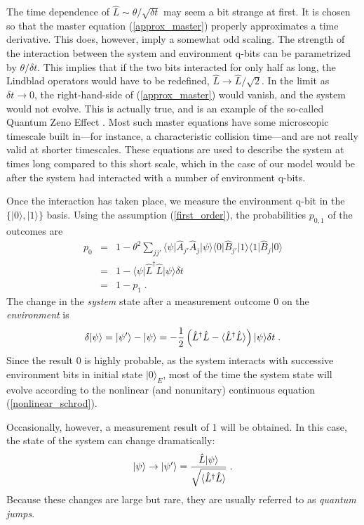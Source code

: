 \documentclass[12pt]{article}
\def\bra#1{{\langle #1 |}}
\def\ket#1{{| #1 \rangle}}
\def\expect#1{{\langle #1 \rangle}}
\def\A{{\hat A}}
\def\B{{\hat B}}
\def\L{{\hat L}}
\def\Ldag{{\hat L^\dagger}}
\begin{document}
The time dependence of $\L \sim \theta/\sqrt{\delta t}$ may seem a bit
strange at first.  It is chosen so that the master equation
(\ref{approx_master}) properly approximates a time derivative.
This does, however, imply a somewhat odd scaling.  The strength of
the interaction between the system and environment q-bits can be
parametrized by $\theta/\delta t$.  This implies that if the two bits
interacted for only half as long, the Lindblad operators would have
to be redefined, $\L \rightarrow \L/\sqrt{2}$.  In the limit as
$\delta t \rightarrow 0$, the right-hand-side of (\ref{approx_master})
would vanish, and the system would not evolve.  This is actually
true, and is an example of the so-called Quantum Zeno Effect \cite{Misra}.
Most such master equations have some microscopic timescale built
in---for instance, a characteristic collision time---and are not
really valid at shorter timescales.  These equations are used to
describe the system at times long compared to this short scale, which
in the case of our model would be after the system had interacted with
a number of environment q-bits.

Once the interaction has taken place,
we measure the environment q-bit in the $\{\ket0,\ket1\}$ basis.
Using the assumption (\ref{first_order}),
the probabilities $p_{0,1}$ of the outcomes are
\begin{eqnarray}
p_0 &=& 1 - \theta^2 \sum_{jj'} \bra\psi\A_{j'}\A_j\ket\psi
  \bra0\B_{j'}\ket1\bra1\B_j\ket0 \nonumber\\
&=& 1 - \bra\psi \Ldag\L \ket\psi \delta t \nonumber\\
&=& 1 - p_1 \;.
\end{eqnarray}
The change in the {\it system} state after a measurement outcome 0
on the {\it environment} is
\begin{equation}
\delta\ket\psi = \ket{\psi'} - \ket\psi = - {1\over2}
  \left( \Ldag\L - \expect{\Ldag\L} \right) \ket\psi \delta t \;.
\label{nonlinear_schrod}
\end{equation}
Since the result 0 is highly probable, as the system interacts with
successive environment bits in initial state $\ket0_E$,
most of the time the system
state will evolve according to the nonlinear (and nonunitary) continuous
equation (\ref{nonlinear_schrod}).

Occasionally, however, a measurement result of 1 will be obtained.
In this case, the state of the system can change dramatically:
\begin{equation}
\ket\psi \rightarrow \ket{\psi'} =
  { \L\ket\psi \over \sqrt{\expect{\Ldag\L}}} \;.
\label{theJump}
\end{equation}
Because these changes are large but rare, they are usually referred to
as {\it quantum jumps}.
\end{document}
